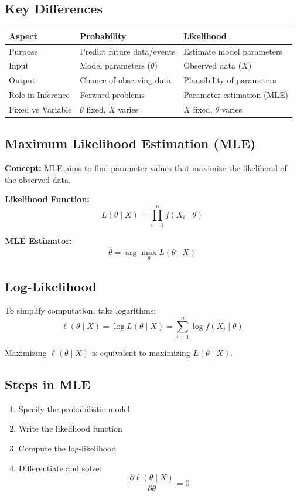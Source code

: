\documentclass[10pt,a4paper]{article}
\begin{document}
\subsection{Key Differences}
\begin{center}
\begin{tabular}{|l|l|l|}
\hline
\textbf{Aspect} & \textbf{Probability} & \textbf{Likelihood} \\
\hline
Purpose & Predict future data/events & Estimate model parameters \\
\hline
Input & Model parameters ($\theta$) & Observed data ($X$) \\
\hline
Output & Chance of observing data & Plausibility of parameters \\
\hline
Role in Inference & Forward problems & Parameter estimation (MLE) \\
\hline
Fixed vs Variable & $\theta$ fixed, $X$ varies & $X$ fixed, $\theta$ varies \\
\hline
\end{tabular}
\end{center}


\subsection{Maximum Likelihood Estimation (MLE)}

\textbf{Concept:}  
MLE aims to find parameter values that maximize the likelihood of the observed data.

\textbf{Likelihood Function:}
\[
L(\theta \mid X) = \prod_{i=1}^{n} f(X_i \mid \theta)
\]

\textbf{MLE Estimator:}
\[
\hat{\theta} = \arg\max_{\theta} L(\theta \mid X)
\]


\subsection{Log-Likelihood}
To simplify computation, take logarithms:
\[
\ell(\theta \mid X) = \log L(\theta \mid X) = \sum_{i=1}^{n} \log f(X_i \mid \theta)
\]

Maximizing $\ell(\theta \mid X)$ is equivalent to maximizing $L(\theta \mid X)$.


\subsection{Steps in MLE}
\begin{enumerate}
    \item Specify the probabilistic model
    \item Write the likelihood function
    \item Compute the log-likelihood
    \item Differentiate and solve:
    \[
    \frac{\partial \ell(\theta \mid X)}{\partial \theta} = 0
    \]
\end{enumerate}
\end{document}
